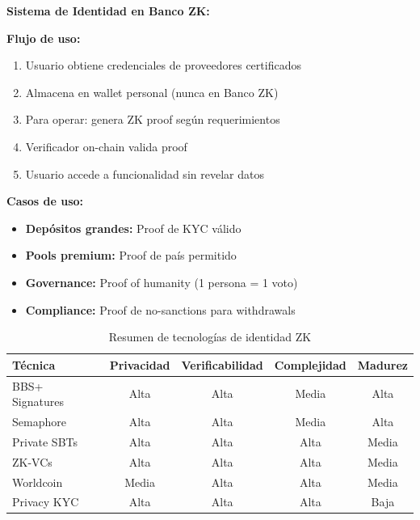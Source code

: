 \documentclass[11pt,a4paper,twoside]{book}
\theoremstyle{definition}
\theoremstyle{remark}
\begin{document}
\begin{bancozk}
\textbf{Sistema de Identidad en Banco ZK:}

\begin{center}
\end{center}

\textbf{Flujo de uso:}
\begin{enumerate}
    \item Usuario obtiene credenciales de proveedores certificados
    \item Almacena en wallet personal (nunca en Banco ZK)
    \item Para operar: genera ZK proof según requerimientos
    \item Verificador on-chain valida proof
    \item Usuario accede a funcionalidad sin revelar datos
\end{enumerate}

\textbf{Casos de uso:}
\begin{itemize}
    \item \textbf{Depósitos grandes:} Proof de KYC válido
    \item \textbf{Pools premium:} Proof de país permitido
    \item \textbf{Governance:} Proof of humanity (1 persona = 1 voto)
    \item \textbf{Compliance:} Proof de no-sanctions para withdrawals
\end{itemize}
\end{bancozk}

\begin{table}[htbp]
\centering
\small
\begin{tabular}{lcccc}
\toprule
\textbf{Técnica} & \textbf{Privacidad} & \textbf{Verificabilidad} & \textbf{Complejidad} & \textbf{Madurez} \\
\midrule
BBS+ Signatures & Alta & Alta & Media & Alta \\
Semaphore & Alta & Alta & Media & Alta \\
Private SBTs & Alta & Alta & Alta & Media \\
ZK-VCs & Alta & Alta & Alta & Media \\
Worldcoin & Media & Alta & Alta & Media \\
Privacy KYC & Alta & Alta & Alta & Baja \\
\bottomrule
\end{tabular}
\caption{Resumen de tecnologías de identidad ZK}
\end{table}
\end{document}
